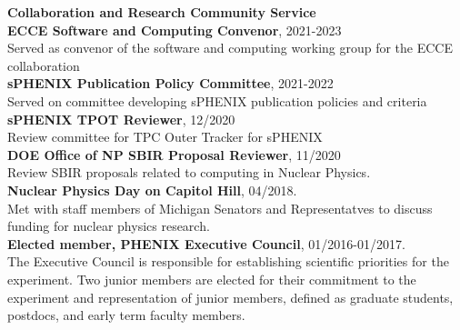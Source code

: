 \documentclass[11pt]{article}
\begin{document}
\vspace{7pt}




\begin{flushleft}
	\Large\textbf{Collaboration and Research Community Service} \\
	\normalsize 
	\vspace{0.3cm}
	\textbf{ECCE Software and Computing Convenor}, 2021-2023 \\ Served as convenor of the software and computing working group for the ECCE collaboration\\
	\vspace*{0.2cm}
	\textbf{sPHENIX Publication Policy Committee}, 2021-2022 \\ Served on committee developing sPHENIX publication policies and criteria \\
	\vspace*{0.2cm}
	\textbf{sPHENIX TPOT Reviewer}, 12/2020 \\ Review committee for TPC Outer Tracker for sPHENIX \\
	\vspace*{0.2cm}
	\textbf{DOE Office of NP SBIR Proposal Reviewer}, 11/2020 \\ Review SBIR proposals related to computing in Nuclear Physics. \\
	\vspace*{0.2cm}
	\textbf{Nuclear Physics Day on Capitol Hill}, 04/2018. \\ Met with staff members of Michigan Senators and Representatves to discuss funding for nuclear physics research.\\
	\vspace*{0.2cm}
	\textbf{Elected member, PHENIX Executive Council}, 01/2016-01/2017.\\ The Executive Council is responsible for establishing scientific priorities for the experiment. Two junior members are elected for their commitment to the experiment and representation of junior members, defined as graduate students, postdocs, and early term faculty members.
	
	
	
\end{flushleft}
\end{document}

